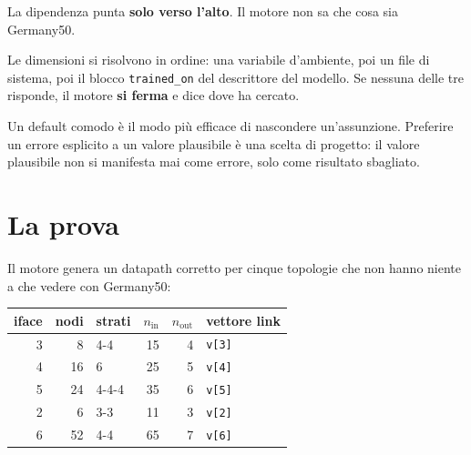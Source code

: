 \documentclass[11pt,a4paper,oneside]{report}
\begin{document}
\begin{center}
\end{center}

La dipendenza punta \textbf{solo verso l'alto}. Il motore non sa che cosa sia
Germany50.

Le dimensioni si risolvono in ordine: una variabile d'ambiente, poi un file di
sistema, poi il blocco \texttt{trained\_on} del descrittore del modello. Se
nessuna delle tre risponde, il motore \textbf{si ferma} e dice dove ha cercato.

\begin{lezione}
Un default comodo è il modo più efficace di nascondere un'assunzione. Preferire
un errore esplicito a un valore plausibile è una scelta di progetto: il valore
plausibile non si manifesta mai come errore, solo come risultato sbagliato.
\end{lezione}

\section{La prova}

Il motore genera un datapath corretto per cinque topologie che non hanno niente
a che vedere con Germany50:

\begin{center}
\small
\begin{tabular}{@{}rrlrrl@{}}
\toprule
\textbf{iface} & \textbf{nodi} & \textbf{strati} & $n_{\text{in}}$ & $n_{\text{out}}$ & \textbf{vettore link} \\
\midrule
3 &  8 & 4-4     & 15 & 4 & \texttt{v[3]} \\
4 & 16 & 6       & 25 & 5 & \texttt{v[4]} \\
5 & 24 & 4-4-4   & 35 & 6 & \texttt{v[5]} \\
2 &  6 & 3-3     & 11 & 3 & \texttt{v[2]} \\
6 & 52 & 4-4     & 65 & 7 & \texttt{v[6]} \\
\bottomrule
\end{tabular}
\end{center}
\end{document}
